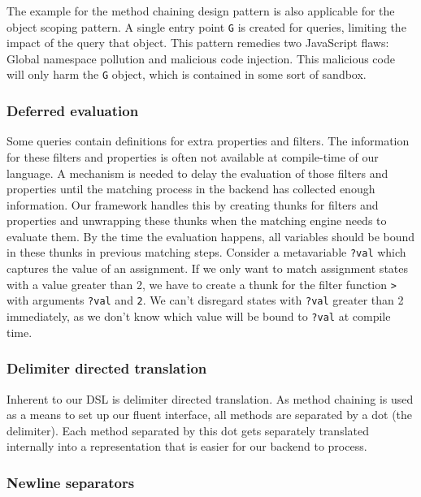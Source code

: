 The example for the method chaining design pattern is also applicable for the object scoping pattern. A single entry point \texttt{G} is created for queries, limiting the impact of the query that object. This pattern remedies two JavaScript flaws: Global namespace pollution and malicious code injection. This malicious code will only harm the \texttt{G} object, which is contained in some sort of sandbox.

\subsubsection*{Deferred evaluation}
Some queries contain definitions for extra properties and filters. The information for these filters and properties is often not available at compile-time of our language. A mechanism is needed to delay the evaluation of those filters and properties until the matching process in the backend has collected enough information. Our framework handles this by creating thunks for filters and properties and unwrapping these thunks when the matching engine needs to evaluate them. By the time the evaluation happens, all variables should be bound in these thunks in previous matching steps. Consider a metavariable \texttt{?val} which captures the value of an assignment. If we only want to match assignment states with a value greater than 2, we have to create a thunk for the filter function \texttt{>} with arguments \texttt{?val} and \texttt{2}. We can't disregard states with \texttt{?val} greater than 2 immediately, as we don't know which value will be bound to \texttt{?val} at compile time.

\subsubsection*{Delimiter directed translation}
Inherent to our DSL is delimiter directed translation. As method chaining is used as a means to set up our fluent interface, all methods are separated by a dot (the delimiter). Each method separated by this dot gets separately translated internally into a representation that is easier for our backend to process.

\subsubsection*{Newline separators}

